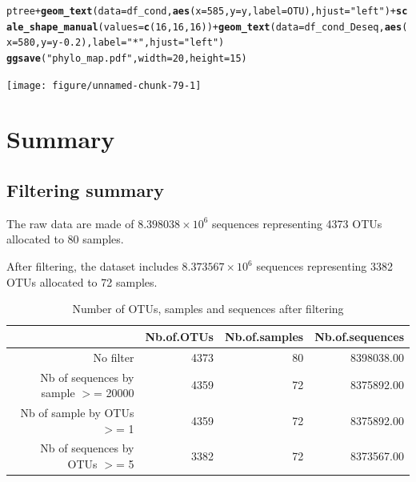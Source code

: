 \documentclass[12pt]{article}\usepackage[]{graphicx}\usepackage[]{color}
\makeatletter
\newcommand{\hlnum}[1]{\textcolor[rgb]{0.686,0.059,0.569}{#1}}%
\newcommand{\hlstr}[1]{\textcolor[rgb]{0.192,0.494,0.8}{#1}}%
\newcommand{\hlopt}[1]{\textcolor[rgb]{0,0,0}{#1}}%
\newcommand{\hlstd}[1]{\textcolor[rgb]{0.345,0.345,0.345}{#1}}%
\newcommand{\hlkwc}[1]{\textcolor[rgb]{0.333,0.667,0.333}{#1}}%
\newcommand{\hlkwd}[1]{\textcolor[rgb]{0.737,0.353,0.396}{\textbf{#1}}}%
\newenvironment{kframe}{%
 \def\at@end@of@kframe{}%
 \ifinner\ifhmode%
  \def\at@end@of@kframe{\end{minipage}}%
  \begin{minipage}{\columnwidth}%
 \fi\fi%
 \def\FrameCommand##1{\hskip\@totalleftmargin \hskip-\fboxsep
 \colorbox{shadecolor}{##1}\hskip-\fboxsep
     \hskip-\linewidth \hskip-\@totalleftmargin \hskip\columnwidth}%
 \MakeFramed {\advance\hsize-\width
   \@totalleftmargin\z@ \linewidth\hsize
   \@setminipage}}%
 {\par\unskip\endMakeFramed%
 \at@end@of@kframe}
\newenvironment{knitrout}{}{} %
\numberwithin{figure}{section}
\makeatother
\begin{document}
\begin{knitrout}\small
{}\color{fgcolor}\begin{kframe}
\begin{alltt}
\hlstd{ptree} \hlopt{+} \hlkwd{geom_text}\hlstd{(}\hlkwc{data} \hlstd{= df_cond,} \hlkwd{aes}\hlstd{(}\hlkwc{x} \hlstd{=} \hlnum{585}\hlstd{,} \hlkwc{y} \hlstd{= y,} \hlkwc{label} \hlstd{= OTU),} \hlkwc{hjust} \hlstd{=} \hlstr{"left"}\hlstd{)} \hlopt{+} \hlkwd{scale_shape_manual}\hlstd{(}\hlkwc{values} \hlstd{=} \hlkwd{c}\hlstd{(}\hlnum{16}\hlstd{,} \hlnum{16}\hlstd{,} \hlnum{16}\hlstd{))} \hlopt{+} \hlkwd{geom_text}\hlstd{(}\hlkwc{data} \hlstd{= df_cond_Deseq,} \hlkwd{aes}\hlstd{(}\hlkwc{x} \hlstd{=} \hlnum{580}\hlstd{,} \hlkwc{y} \hlstd{= y}\hlopt{-}\hlnum{0.2}\hlstd{),} \hlkwc{label} \hlstd{=} \hlstr{"*"}\hlstd{,} \hlkwc{hjust} \hlstd{=} \hlstr{"left"}\hlstd{)}
\hlkwd{ggsave}\hlstd{(}\hlstr{"phylo_map.pdf"}\hlstd{,}  \hlkwc{width} \hlstd{=} \hlnum{20}\hlstd{,} \hlkwc{height} \hlstd{=} \hlnum{15}\hlstd{)}
\end{alltt}
\end{kframe}

{\centering \texttt{[image: figure/unnamed-chunk-79-1]} 

}



\end{knitrout}



\section{Summary}
\label{sect:summary}

  \subsection{Filtering summary}

The raw data are made of \ensuremath{8.398038\times 10^{6}} sequences representing 4373 OTUs allocated to 80 samples.

After filtering, the dataset includes \ensuremath{8.373567\times 10^{6}} sequences representing 3382 OTUs allocated to 72 samples.

\begin{table}[ht]
\centering
\begin{tabular}{rrrr}
  \hline
 & Nb.of.OTUs & Nb.of.samples & Nb.of.sequences \\ 
  \hline
No filter & 4373 &  80 & 8398038.00 \\ 
  Nb of sequences by sample $>$=  20000 & 4359 &  72 & 8375892.00 \\ 
  Nb of sample by OTUs $>$=  1 & 4359 &  72 & 8375892.00 \\ 
  Nb of sequences by OTUs $>$=  5 & 3382 &  72 & 8373567.00 \\ 
   \hline
\end{tabular}
\caption{Number of OTUs, samples and sequences after filtering} 
\end{table}
\end{document}
